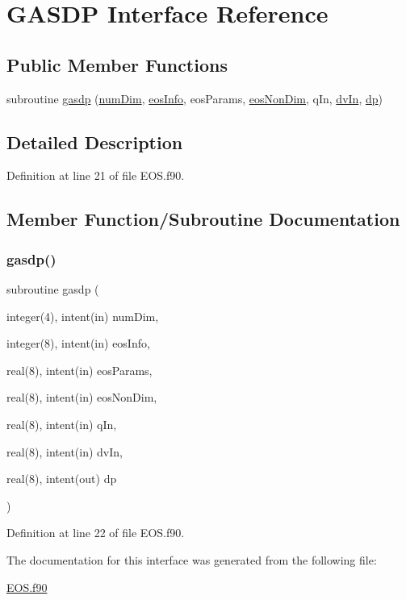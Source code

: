 \hypertarget{interfaceeos_1_1GASDP}{}\section{G\+A\+S\+DP Interface Reference}
\label{interfaceeos_1_1GASDP}
\subsection*{Public Member Functions}
\begin{DoxyCompactItemize}
\item 
subroutine \hyperlink{interfaceeos_1_1GASDP_acab85ec31b74dd12479546bf8de0269b}{gasdp} (\hyperlink{SATKernels_8H_a680185db8546de161968dabace9e94f1}{num\+Dim}, \hyperlink{WENOKernels_8H_a9b67b225dd1b2bffc0623aa04a80bfc4}{eos\+Info}, eos\+Params, \hyperlink{WENOKernels_8H_ae84c458d3f8dce53d214eabcdc84b623}{eos\+Non\+Dim}, q\+In, \hyperlink{RoeKernels_8H_a24a50bb7f3155b1d6314eec79d33d669}{dv\+In}, \hyperlink{RoeKernels_8H_ac12401cc24ddbf8b003a0e6201826e90}{dp})
\end{DoxyCompactItemize}


\subsection{Detailed Description}


Definition at line 21 of file E\+O\+S.\+f90.



\subsection{Member Function/\+Subroutine Documentation}
\hypertarget{interfaceeos_1_1GASDP_acab85ec31b74dd12479546bf8de0269b}{}\label{interfaceeos_1_1GASDP_acab85ec31b74dd12479546bf8de0269b} 
\subsubsection{\texorpdfstring{gasdp()}{gasdp()}}
{\footnotesize\ttfamily subroutine gasdp (\begin{DoxyParamCaption}\item[{integer(4), intent(in)}]{num\+Dim,  }\item[{integer(8), intent(in)}]{eos\+Info,  }\item[{real(8), intent(in)}]{eos\+Params,  }\item[{real(8), intent(in)}]{eos\+Non\+Dim,  }\item[{real(8), intent(in)}]{q\+In,  }\item[{real(8), intent(in)}]{dv\+In,  }\item[{real(8), intent(out)}]{dp }\end{DoxyParamCaption})}



Definition at line 22 of file E\+O\+S.\+f90.



The documentation for this interface was generated from the following file\+:\begin{DoxyCompactItemize}
\item 
\hyperlink{EOS_8f90}{E\+O\+S.\+f90}\end{DoxyCompactItemize}
